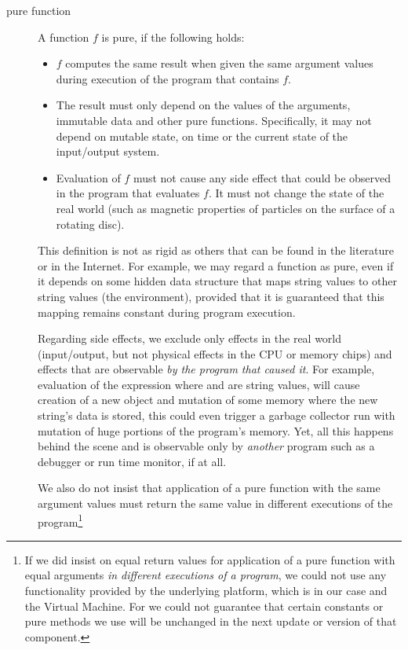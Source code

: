 \begin{description}
\item[pure function] A function $f$ is pure, if the following holds:
\begin{itemize}
\item $f$ computes the same result when given the same argument values during execution of the program that contains $f$.
\item The result must only depend on the values of the arguments, immutable data and other pure functions. Specifically, it may not depend on mutable state, on time or the current state of the input/output system.
\item Evaluation of $f$ must not cause any side effect that could be observed in the program that evaluates $f$. It must not  change the state of the real world (such as magnetic properties of particles on the surface of a rotating disc).
\end{itemize}
This definition is not as rigid as others that can be found in the literature or in the Internet. For example, we may regard a function  as pure, even if it depends on some hidden data structure that maps string values to other string values (the environment), provided that it is guaranteed that this mapping remains constant during program execution. 

Regarding side effects, we exclude only effects in the real world (input/output, but not physical effects in the CPU or memory chips) and effects that are observable \emph{by the program that caused it}. For example, evaluation of the expression
where  and  are string values, will cause creation of a new \java{}  object and mutation of some memory where the new string's data is stored, this could even trigger a garbage collector run with mutation of huge portions of the program's memory. Yet, all this happens behind the scene and is observable only by \emph{another} program such as a debugger or run time monitor, if at all.

We also do not insist that application of a pure function with the same argument values must return the same value in different executions of the program\footnote{If we did insist on equal return values for application of a pure function with equal arguments \emph{in different executions of a program}, we could not use any functionality provided by the underlying platform, which is in our case \java{} and the \java{} Virtual Machine. For we could not guarantee that certain constants or pure methods we use will be unchanged in the next update or version of that component. 

}
\end{description}

